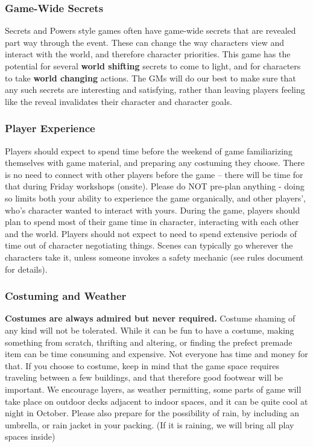 \documentclass[sheet]{PP}
\begin{document}
\subsubsection{Game-Wide Secrets}
Secrets and Powers style games often have game-wide secrets that are revealed part way through the event. These can change the way characters view and interact with the world, and therefore character priorities. This game has the potential for several \textbf{world shifting} secrets to come to light, and for characters to take \textbf{world changing} actions. The GMs will do our best to make sure that any such secrets are interesting and satisfying, rather than leaving players feeling like the reveal invalidates their character and character goals. 

\subsubsection{Player Experience}
Players should expect to spend time before the weekend of game familiarizing themselves with game material, and preparing any costuming they choose. There is no need to connect with other players before the game -- there will be time for that during Friday workshops (onsite). Please do NOT pre-plan anything - doing so limits both your ability to experience the game organically, and other players', who's character wanted to interact with yours.  During the game, players should plan to spend most of their game time in character, interacting with each other and the world. Players should not expect to need to spend extensive periods of time out of character negotiating things. Scenes can typically go wherever the characters take it, unless someone invokes a safety mechanic (see rules document for details).

\subsubsection{Costuming and Weather} 
\textbf{Costumes are always admired but never required.} Costume shaming of any kind will not be tolerated. While it can be fun to have a costume, making something from scratch, thrifting and altering, or finding the prefect premade item can be time consuming and expensive. Not everyone has time and money for that. If you choose to costume, keep in mind that the game space requires traveling between a few buildings, and that therefore good footwear will be important. We encourage layers, as weather permitting, some parts of game will take place on outdoor decks adjacent to indoor spaces, and it can be quite cool at night in October. Please also prepare for the possibility of rain, by including an umbrella, or rain jacket in your packing. (If it is raining, we will bring all play spaces inside)
\end{document}
